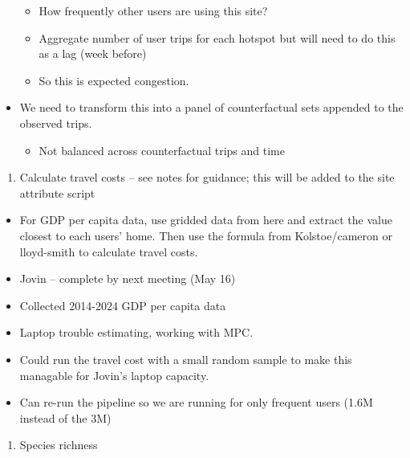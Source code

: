 \documentclass[
  letterpaper,
]{article}
\providecommand{\tightlist}{%
  \setlength{\itemsep}{0pt}\setlength{\parskip}{0pt}}\usepackage{longtable,booktabs,array}
\begin{document}
\begin{tcolorbox}
\begin{itemize}
  \begin{itemize}
  \tightlist
  \item
    How frequently other users are using this site?
  \item
    Aggregate number of user trips for each hotspot but will need to do
    this as a lag (week before)
  \item
    So this is expected congestion.
  \end{itemize}
\item
  We need to transform this into a panel of counterfactual sets appended
  to the observed trips.

  \begin{itemize}
  \tightlist
  \item
    Not balanced across counterfactual trips and time
  \end{itemize}
\end{itemize}

\begin{enumerate}
\def\labelenumi{\arabic{enumi}.}
\setcounter{enumi}{1}
\tightlist
\item
  Calculate travel costs -- see notes for guidance; this will be added
  to the site attribute script
\end{enumerate}

\begin{itemize}
\tightlist
\item
  For GDP per capita data, use gridded data from here and extract the
  value closest to each users' home. Then use the formula from
  Kolstoe/cameron or lloyd-smith to calculate travel costs.
\item
  Jovin -- complete by next meeting (May 16)
\item
  Collected 2014-2024 GDP per capita data
\item
  Laptop trouble estimating, working with MPC.
\item
  Could run the travel cost with a small random sample to make this
  managable for Jovin's laptop capacity.
\item
  Can re-run the pipeline so we are running for only frequent users
  (1.6M instead of the 3M)
\end{itemize}

\begin{enumerate}
\def\labelenumi{\arabic{enumi}.}
\setcounter{enumi}{2}
\tightlist
\item
  Species richness
\end{enumerate}


\end{tcolorbox}
\end{document}
